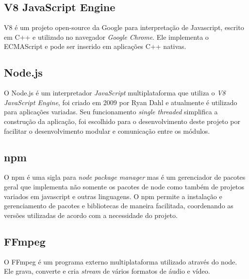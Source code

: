 \subsection{V8 JavaScript Engine}
\label{s.v8}

V8 é um projeto open-source da Google para interpretação de Javascript, escrito em C++ e utilizado no navegador \emph{Google Chrome}. Ele implementa o ECMAScript e pode ser inserido em aplicações C++ nativas.

\subsection{Node.js}
\label{s.nodejs}

O Node.js é um interpretador \emph{JavaScript} multiplataforma que utiliza o \emph{V8 JavaScript Engine}, foi criado em 2009 por Ryan Dahl e atualmente é utilizado para aplicações variadas. Seu funcionamento \emph{single threaded} simplifica a construção da aplicação, foi escolhido para o desenvolvimento deste projeto por facilitar o desenvolvimento modular e comunicação entre os módulos.

\subsection{npm}
\label{s.npm}

O npm é uma sigla para \emph{node package manager} mas é um gerenciador de pacotes geral que implementa não somente os pacotes de node como também de projetos variados em javascript e outras linguagens. O npm permite a instalação e gerenciamento de pacotes e bibliotecas de maneira facilitada, coordenando as versões utilizadas de acordo com a necessidade do projeto.

\subsection{FFmpeg}
\label{s.ffmpeg}

O FFmpeg é um programa externo multiplataforma utilizado através do node. Ele grava, converte e cria \emph{stream} de vários formatos de áudio e vídeo.

